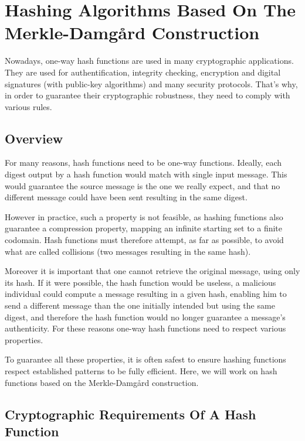 \chapter{Hashing Algorithms Based On The Merkle-Damg\r{a}rd  Construction}\label{chap:Merkle}

Nowadays, one-way hash functions are used in many cryptographic applications.\\
They are used for authentification, integrity checking, encryption and digital signatures (with public-key algorithms) and many security protocols. That's why, in order to guarantee their cryptographic robustness, they need to comply with various rules.

\section{Overview}

For many reasons, hash functions need to be one-way functions.
Ideally, each digest output by a hash function would match with single input message. This would guarantee the source message is the one we really expect, and that no different message could have been sent resulting in the same digest.

However in practice, such a property is not feasible, as hashing functions also guarantee a compression property, mapping an infinite starting set to a finite codomain.
Hash functions must therefore attempt, as far as possible, to avoid what are called collisions (two messages resulting in the same hash).

Moreover it is important that one cannot retrieve the original message, using only its hash.
If it were possible, the hash function would be useless, a malicious individual could compute a message resulting in a given hash, enabling him to send a different message than the one initially intended but using the same digest, and therefore the hash function would no longer guarantee a message's authenticity. For these reasons one-way hash functions need to respect various properties.

To guarantee all these properties, it is often safest to ensure hashing functions respect established patterns to be fully efficient. Here, we will work on hash functions based on the Merkle-Damg\r{a}rd construction. %


\section{Cryptographic Requirements Of A Hash Function}~\label{sec:requirements}

